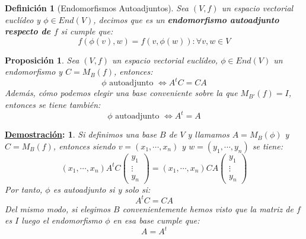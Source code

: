 \documentclass[10pt,a4paper,openright]{book}
\theoremstyle{break}
\newtheorem*{defi}{Definición}
\newtheorem*{prop}{Proposición}
\newtheorem*{demo}{\underline{Demostración}:}
\begin{document}
\begin{defi}[Endomorfismos Autoadjuntos]
Sea $(V,f)$ un espacio vectorial euclídeo y $\phi\in End(V)$, decimos que es un \textbf{endomorfismo autoadjunto respecto de $f$} si cumple que:
$$f(\phi(v),w) = f(v,\phi(w)): \forall v,w\in V$$
\end{defi}

\begin{prop}
Sea $(V,f)$ un espacio vectorial euclídeo, $\phi \in End(V)$ un endomorfismo y $C = M_B(f)$, entonces:
$$\phi \mbox{ autoadjunto } \Leftrightarrow A^tC=CA$$
Además, cómo podemos elegir una base conveniente sobre la que $M_{B'}(f) = I$, entonces se tiene también:
$$\phi \mbox{ autoadjunto } \Leftrightarrow A^t=A$$
\end{prop}
\begin{demo}
Si definimos una base $B$ de $V$ y llamamos $A=M_B(\phi)$ y $C=M_B(f)$, entonces siendo $v=(x_1, \cdots, x_n)$ y $w=(y_1, \cdots, y_n)$ se tiene:
$$(x_1, \cdots, x_n) A^tC \begin{pmatrix} y_1 \\ \vdots \\ y_n\end{pmatrix} = (x_1, \cdots, x_n)CA\begin{pmatrix} y_1 \\ \vdots \\ y_n\end{pmatrix}$$
Por tanto, $\phi$ es autoadjunto si y solo si:
$$A^tC=CA$$
Del mismo modo, si elegimos $B$ convenientemente hemos visto que la matriz de $f$ es $I$ luego el endomorfismo $\phi$ en esa base cumple que:
$$A=A^t$$
\end{demo}
\end{document}
